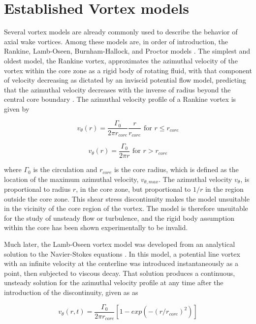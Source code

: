 \section{Established Vortex models}
Several vortex models are already commonly used to describe the behavior of 
axial wake vortices. Among these models are, in order of introduction, the 
Rankine, Lamb-Oseen, Burnham-Hallock, and Proctor models \cite{ahmad2014}. The 
simplest and oldest model, the Rankine vortex, approximates the azimuthal 
velocity of the vortex within the core zone as a rigid body of rotating fluid, 
with that component of velocity decreasing as dictated by an inviscid potential 
flow model, predicting that the azimuthal velocity decreases with the inverse 
of radius beyond the central core boundary \cite{rankine1869}. The azimuthal 
velocity profile of a Rankine vortex is given by

\begin{equation}
v_{\theta}(r) = \frac{\Gamma_0}{2 \pi r_{core}} \frac{r}{r_{core}} 
	\text{ for } r \leq r_{core}
	\label{eq:rankine1}
\end{equation}

\begin{equation}
v_{\theta}(r) = \frac{\Gamma_0}{2 \pi r}
	\text{ for } r > r_{core}
	\label{eq:rankine2}
\end{equation}

\noindent
where $\Gamma_0$ is the circulation and $r_{core}$ is the core radius,
which is defined as the location of the maximum azimuthal velocity, 
$v_{\theta, max}$. The azimuthal velocity $v_{\theta}$, is proportional to 
radius $r$, in the core zone, but proportional to $1/r$ in the region outside 
the core zone. This shear stress discontinuity makes the model unsuitable in 
the vicinity of the core region of the vortex. The model is therefore 
unsuitable for the study of unsteady flow or turbulence, and the rigid body 
assumption within the core has been shown experimentally to be invalid.

Much later, the Lamb-Oseen vortex model was developed from an 
analytical solution to the Navier-Stokes equations \cite{lamb1932}. In this 
model, a potential 
line vortex with an infinite velocity at the centerline was introduced 
instantaneously as a point, then subjected to viscous decay. That solution 
produces a continuous, unsteady solution for the azimuthal 
velocity profile at any time after the introduction of the discontinuity, given 
as as

\begin{equation}
v_{\theta}(r,t) = \frac{\Gamma_0}{2 \pi r_{core}}[1 - 
							exp(-(r / r_{core})^2)]
	\label{eq:lamb1}
\end{equation}

